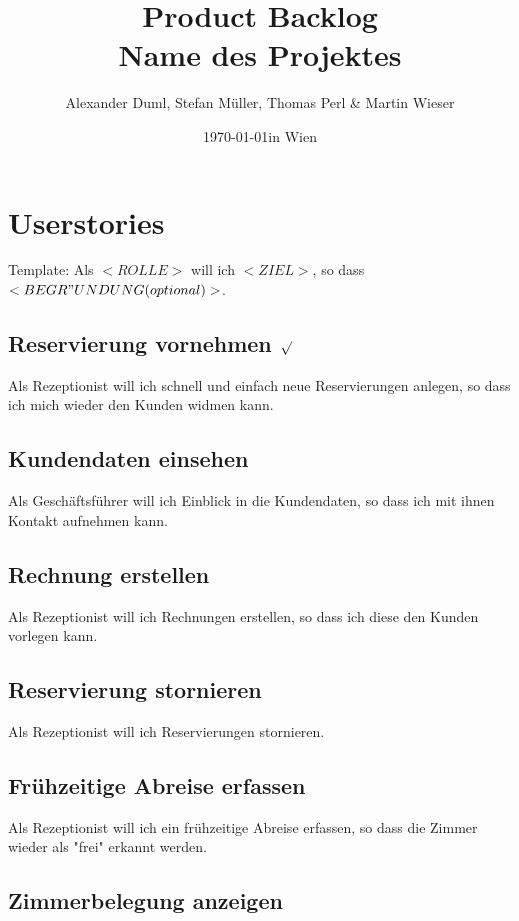 \documentclass[11pt]{scrartcl}
\title{Product Backlog \\ \large Name des Projektes}
\author{Alexander Duml, Stefan Müller, Thomas Perl \& Martin Wieser}
\date{\today in Wien}
\begin{document}
\maketitle

\section{Userstories}

Template: Als $<ROLLE>$ will ich $<ZIEL>$, so dass $<BEGR"UNDUNG (optional)>$.

\subsection{Reservierung vornehmen $\surd$}

Als Rezeptionist will ich schnell und einfach neue Reservierungen anlegen, so dass ich mich wieder den Kunden widmen kann.

\subsection{Kundendaten einsehen}

Als Geschäftsführer will ich Einblick in die Kundendaten, so dass ich mit ihnen Kontakt aufnehmen kann.

\subsection{Rechnung erstellen}

Als Rezeptionist will ich Rechnungen erstellen, so dass ich diese den Kunden vorlegen kann.

\subsection{Reservierung stornieren}

Als Rezeptionist will ich Reservierungen stornieren.

\subsection{Frühzeitige Abreise erfassen}

Als Rezeptionist will ich ein frühzeitige Abreise erfassen, so dass die Zimmer wieder als "frei" erkannt werden.

\subsection{Zimmerbelegung anzeigen}
\end{document}

